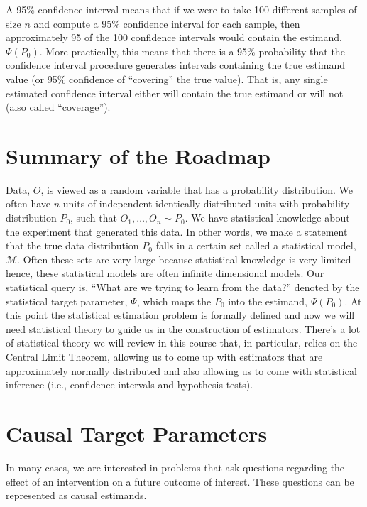 \documentclass[12pt, krantz2,]{book}
\theoremstyle{definition}
\theoremstyle{definition}
\theoremstyle{definition}
\newcommand{\1}{\mathbbm{1}}
\begin{document}
A 95\% confidence interval means that if we were to take 100 different samples
of size \(n\) and compute a 95\% confidence interval for each sample, then
approximately 95 of the 100 confidence intervals would contain the estimand,
\(\Psi(P_0)\). More practically, this means that there is a 95\% probability
that the confidence interval procedure generates intervals containing the
true estimand value (or 95\% confidence of ``covering'' the true value). That is,
any single estimated confidence interval either will contain the true estimand
or will not (also called ``coverage'').

\hypertarget{roadmap-summary}{%
\section{Summary of the Roadmap}\label{roadmap-summary}}

Data, \(O\), is viewed as a random variable that has a probability distribution.
We often have \(n\) units of independent identically distributed units with
probability distribution \(P_0\), such that \(O_1, \ldots, O_n \sim P_0\). We have
statistical knowledge about the experiment that generated this data. In other
words, we make a statement that the true data distribution \(P_0\) falls in a
certain set called a statistical model, \(\mathcal{M}\). Often these sets are very
large because statistical knowledge is very limited - hence, these statistical
models are often infinite dimensional models. Our statistical query is, ``What
are we trying to learn from the data?'' denoted by the statistical target
parameter, \(\Psi\), which maps the \(P_0\) into the estimand, \(\Psi(P_0)\). At this
point the statistical estimation problem is formally defined and now we will
need statistical theory to guide us in the construction of estimators. There's a
lot of statistical theory we will review in this course that, in particular,
relies on the Central Limit Theorem, allowing us to come up with estimators that
are approximately normally distributed and also allowing us to come with
statistical inference (i.e., confidence intervals and hypothesis tests).

\hypertarget{causal}{%
\section{Causal Target Parameters}\label{causal}}

In many cases, we are interested in problems that ask questions regarding the
effect of an intervention on a future outcome of interest. These questions can
be represented as causal estimands.
\end{document}

